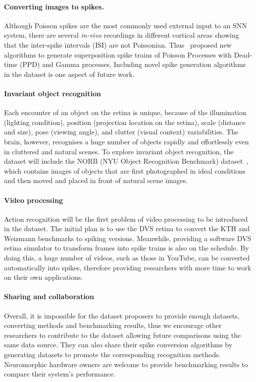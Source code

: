\paragraph{Converting images to spikes.}
Although Poisson spikes are the most commonly used external input to an SNN system, there are several \textit{in-vivo} recordings in different cortical areas showing that the inter-spike intervals (ISI) are not Poissonian. 
Thus~\citet{deger2012statistical} proposed new algorithms to generate superposition spike trains of Poisson Processes with Dead-time (PPD) and Gamma processes.
Including novel spike generation algorithms in the dataset is one aspect of future work.

\paragraph{Invariant object recognition}
Each encounter of an object on the retina is unique, because of the illumination (lighting condition), position (projection location on the retina), scale (distance and size), pose (viewing angle), and clutter (visual context) variabilities.
The brain, however, recognises a huge number of objects rapidly and effortlessly even in cluttered and natural scenes.
To explore invariant object recognition, the dataset will include the NORB (NYU Object Recognition Benchmark) dataset~\citep{lecun2004learning}, which contains images of objects that are first photographed in ideal conditions and then moved and placed in front of natural scene images.

\paragraph{Video processing}
Action recognition will be the first problem of video processing to be introduced in the dataset.
The initial plan is to use the DVS retina to convert the KTH and Weizmann benchmarks to spiking versions.
Meanwhile, providing a software DVS retina simulator to transform frames into spike trains is also on the schedule.
By doing this, a huge number of videos, such as those in YouTube, can be converted automatically into spikes, therefore providing researchers with more time to work on their own applications.

\paragraph{Sharing and collaboration}
Overall, it is impossible for the dataset proposers to provide enough datasets, converting methods and benchmarking results, thus we encourage other researchers to contribute to the dataset allowing future comparisons using the same data source.
They can also share their spike conversion algorithms by generating datasets to promote the corresponding recognition methods.
Neuromorphic hardware owners are welcome to provide benchmarking results to compare their system's performance.

